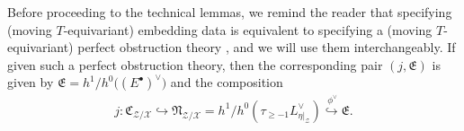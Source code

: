 \begin{remark}\label{rl-000W}\label{rmk:embedding-data-is-POT}
  Before proceeding to the technical lemmas, we remind the reader that specifying (moving \(T\)-equivariant) embedding data is equivalent to specifying a (moving \(T\)-equivariant) perfect obstruction theory \cite[Prop. 3.11]{manolache_VirtualPullbacks2012}, and we will use them interchangeably. If given such a perfect obstruction theory, then the corresponding pair \((j,\mathfrak E)\) is given by \(\mathfrak E = h^1/h^0\big((E^\bullet)^\vee\big)\) and the composition
  \begin{align*}
    j: \mathfrak C_{\mathcal Z/\mathcal X} \hookrightarrow \mathfrak N_{\mathcal Z/\mathcal X} = h^1/h^0(\tau_{\geq -1}L_{\eta|_{\mathcal Z}}^\vee) \overset{~\phi^\vee}{\hookrightarrow}\mathfrak E.
  \end{align*}
\end{remark}

